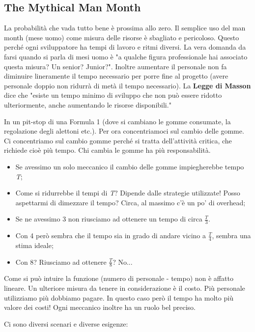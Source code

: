 \subsection{The Mythical Man Month}
La probabilità che vada tutto bene è prossima allo zero.
Il semplice uso del man month (mese uomo) come misura delle risorse è sbagliato e pericoloso. Questo perché ogni sviluppatore ha tempi di lavoro e ritmi diversi. La vera domanda da farsi quando si parla di mesi uomo è "a qualche figura professionale hai associato questa misura? Un senior? Junior?".
Inoltre aumentare il personale non fa diminuire lineramente il tempo necessario per porre fine al progetto (avere personale doppio non ridurrà di metà il tempo necessario).\newline
La \textbf{Legge di Masson} dice che "esiste un tempo minimo di sviluppo che non può essere ridotto ulteriormente, anche aumentando le risorse disponibili."
\begin{info}[Esempio]
	In un pit-stop di una Formula 1 (dove si cambiano le gomme consumate, la regolazione degli alettoni etc.). Per ora concentriamoci sul cambio delle gomme. Ci concentriamo sul cambio gomme perché si tratta dell'attività critica, che richiede cioè più tempo. Chi cambia le gomme ha più responsabilità.
	\begin{itemize}
		\item Se avessimo un solo meccanico il cambio delle gomme impiegherebbe tempo \textit{T};
		\item Come si ridurrebbe il tempi di \textit{T}? Dipende dalle strategie utilizzate! Posso aspettarmi di dimezzare il tempo? Circa, al massimo c'è un po' di overhead;
		\item Se ne avessimo 3 non riusciamo ad ottenere un tempo di circa $\frac{T}{3}$.
		\item Con 4 però sembra che il tempo sia in grado di andare vicino a $\frac{T}{4}$, sembra una stima ideale;
		\item Con 8? Riusciamo ad ottenere $\frac{T}{8}$? No...
	\end{itemize}
	Come si può intuire la funzione (numero di personale - tempo) non è affatto lineare.
	Un ulteriore misura da tenere in considerazione è il costo. Più personale utilizziamo più dobbiamo pagare.\newline
	In questo caso però il tempo ha molto più valore dei costi!\newline
	Ogni meccanico inoltre ha un ruolo bel preciso.
\end{info}
Ci sono diversi scenari e diverse esigenze:
